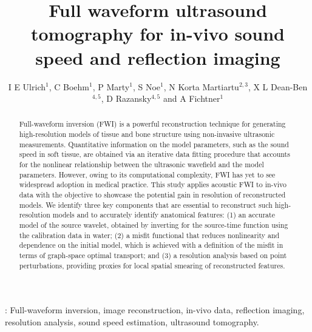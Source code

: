 \documentclass[12pt]{iopart}
\begin{document}
\title[]{Full waveform ultrasound tomography for in-vivo sound speed and reflection imaging}

\author{I E Ulrich$^1$,  C Boehm$^1$,
P Marty$^1$, S Noe$^1$, N Korta Martiartu$^{2,3}$, X L Dean-Ben$^{4, 5}$, D Razansky$^{4, 5}$ and A Fichtner$^1$}

\address{$^1$ Institute of Geophysics, ETH Zurich, Sonneggstrasse 5, 8092 Zurich, Switzerland}
\address{$^2$ Institute of Applied Physics, University of Bern, Sidlerstrasse 5, 3012 Bern, Switzerland}
\address{$^3$ Institut Langevin, ESPCI Paris, PSL University, CNRS, 1 rue Jussieu, F-75005, Paris, France}
\address{$^4$ Institute of Pharmacology and Toxicology and Institute for Biomedical Engineering, University of Zurich, Winterthurerstrasse 190, 8057 Zurich, Switzerland}
\address{$^5$ Institute for Biomedical Engineering, ETH Zurich, Wolfgang-Pauli-Strasse 27, 8049 Zurich, Switzerland}

\vspace{10pt}

\begin{abstract}
	Full-waveform inversion (FWI) is a powerful reconstruction technique for generating high-resolution models of tissue and bone structure using non-invasive ultrasonic measurements. Quantitative information on the model parameters, such as the sound speed in soft tissue, are obtained via an iterative data fitting procedure that accounts for the nonlinear relationship between the ultrasonic wavefield and the model parameters. However, owing to its computational complexity, FWI has yet to see widespread adoption in medical practice. This study applies acoustic FWI to in-vivo data with the objective to showcase the potential gain in resolution of reconstructed models. We identify three key components that are essential to reconstruct such high-resolution models and to accurately identify anatomical features: (1) an accurate model of the source wavelet, obtained by inverting for the source-time function using the calibration data in water; (2) a misfit functional that reduces nonlinearity and dependence on the initial model, which is achieved with a definition of the misfit in terms of graph-space optimal transport; and (3) a resolution analysis based on point perturbations, providing proxies for local spatial smearing of reconstructed features. 
\end{abstract}

%
\vspace{2pc}
: Full-waveform inversion, image reconstruction, in-vivo data, reflection imaging, resolution analysis, sound speed estimation, ultrasound tomography.
%
%
% 
%
\end{document}
